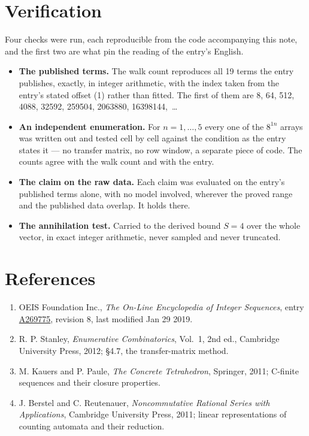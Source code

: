 \documentclass[11pt]{article}
\theoremstyle{definition}
\begin{document}
\section{Verification}

Four checks were run, each reproducible from the code accompanying this note, and the first two are what pin the reading of the entry's English.

\begin{itemize}

\item {\bfseries The published terms.} The walk count reproduces all 19 terms the entry publishes, exactly, in integer arithmetic, with the index taken from the entry's stated offset (1) rather than fitted. The first of them are 8, 64, 512, 4088, 32592, 259504, 2063880, 16398144,~\dots

\item {\bfseries An independent enumeration.} For $n = 1,\dots,5$ every one of the $8^{1n}$ arrays was written out and tested cell by cell against the condition as the entry states it --- no transfer matrix, no row window, a separate piece of code. The counts agree with the walk count and with the entry.

\item {\bfseries The claim on the raw data.} Each claim was evaluated on the entry's published terms alone, with no model involved, wherever the proved range and the published data overlap. It holds there.

\item {\bfseries The annihilation test.} Carried to the derived bound $S = 4$ over the whole vector, in exact integer arithmetic, never sampled and never truncated.

\end{itemize}

\section{References}

\begin{enumerate}

\item OEIS Foundation Inc., \emph{The On-Line Encyclopedia of Integer Sequences}, entry \href{https://oeis.org/A269775}{A269775}, revision 8, last modified Jan 29 2019.

\item R. P. Stanley, \emph{Enumerative Combinatorics}, Vol.~1, 2nd ed., Cambridge University Press, 2012; \S4.7, the transfer-matrix method.

\item M. Kauers and P. Paule, \emph{The Concrete Tetrahedron}, Springer, 2011; C-finite sequences and their closure properties.

\item J. Berstel and C. Reutenauer, \emph{Noncommutative Rational Series with Applications}, Cambridge University Press, 2011; linear representations of counting automata and their reduction.

\end{enumerate}
\end{document}
